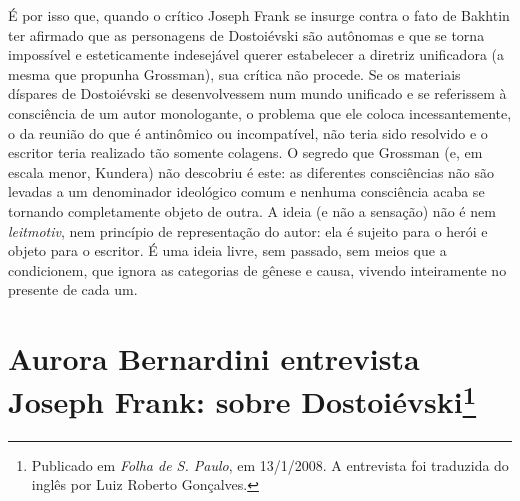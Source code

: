 É por isso que, quando o crítico Joseph Frank se insurge contra o fato
de Bakhtin ter afirmado que as personagens de Dostoiévski são autônomas e que se torna impossível e esteticamente indesejável querer estabelecer a
diretriz unificadora (a mesma que propunha Grossman), sua crítica não
procede. Se os materiais díspares de Dostoiévski se desenvolvessem num
mundo unificado e se referissem à consciência de um autor monologante, o
problema que ele coloca incessantemente, o da reunião do que é
antinômico ou incompatível, não teria sido resolvido e o escritor teria
realizado tão somente colagens. O segredo que Grossman (e, em escala
menor, Kundera) não descobriu é este: as diferentes consciências não
são levadas a um denominador ideológico comum e nenhuma consciência
acaba se tornando completamente objeto de outra. A ideia (e não a
sensação) não é nem \emph{leitmotiv}, nem princípio de representação do
autor: ela é sujeito para o herói e objeto para o escritor. É uma ideia
livre, sem passado, sem meios que a condicionem, que ignora as
categorias de gênese e causa, vivendo inteiramente no presente de cada
um.

\chapter*{Aurora Bernardini entrevista\\ Joseph Frank: sobre Dostoiévski\footnote{Publicado em \emph{Folha de S. Paulo}, em 13/1/2008. A entrevista foi traduzida do inglês por Luiz Roberto Gonçalves.}}

\label{frank}



